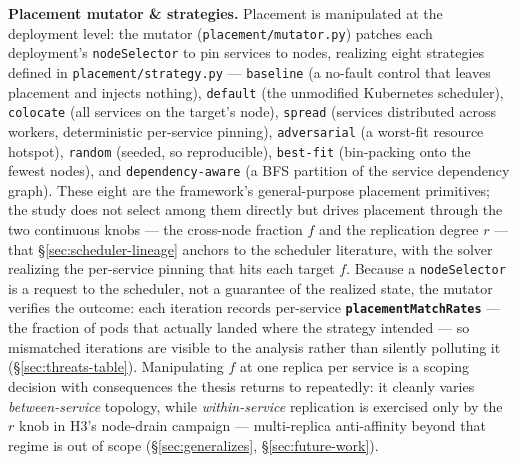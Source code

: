 \textbf{Placement mutator \& strategies.} Placement is manipulated at the
deployment level: the mutator (\texttt{placement/mutator.py}) patches each
deployment's \texttt{nodeSelector} to pin services to nodes, realizing eight
strategies defined in \texttt{placement/strategy.py} --- \texttt{baseline} (a no-fault
control that leaves placement and injects nothing), \texttt{default} (the unmodified
Kubernetes scheduler), \texttt{colocate} (all services on the target's node),
\texttt{spread} (services distributed across workers, deterministic per-service
pinning), \texttt{adversarial} (a worst-fit resource hotspot), \texttt{random} (seeded, so
reproducible), \texttt{best-fit} (bin-packing onto the fewest nodes), and
\texttt{dependency-aware} (a BFS partition of the service dependency graph).
These eight are the framework's general-purpose placement primitives; the
study does not select among them directly but drives placement
through the two continuous knobs --- the cross-node fraction $f$ and the
replication degree $r$ --- that \S\ref{sec:scheduler-lineage} anchors to the
scheduler literature, with the solver realizing the per-service pinning that hits
each target $f$. Because a \texttt{nodeSelector} is a
request to the scheduler, not a guarantee of the realized state, the mutator
verifies the outcome: each iteration records per-service
\textbf{\texttt{placementMatchRates}} --- the fraction of pods that actually landed where
the strategy intended --- so mismatched iterations are visible to the analysis
rather than silently polluting it (\S\ref{sec:threats-table}). Manipulating $f$
at one replica per service is a scoping decision with consequences the thesis
returns to repeatedly: it cleanly varies \emph{between-service} topology, while
\emph{within-service} replication is exercised only by the $r$ knob in H3's
node-drain campaign --- multi-replica anti-affinity beyond that regime is out of
scope (\S\ref{sec:generalizes}, \S\ref{sec:future-work}).

